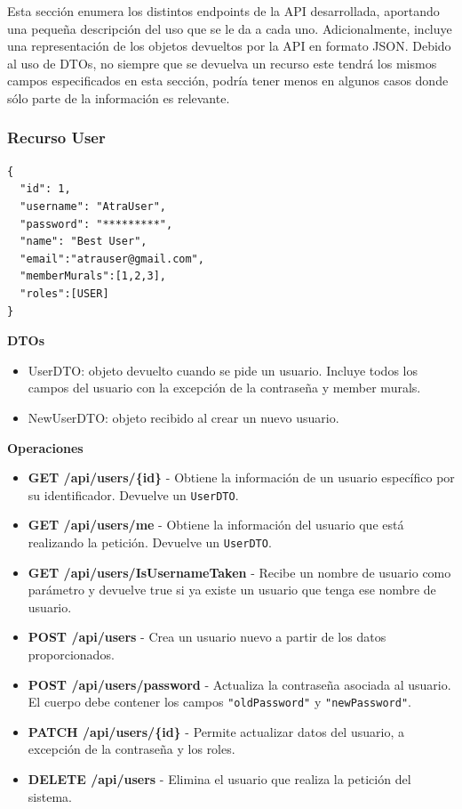 Esta sección enumera los distintos endpoints de la API desarrollada, aportando una pequeña descripción del uso que se le da a cada uno. Adicionalmente, incluye una representación de los objetos devueltos por la API en formato JSON. Debido al uso de DTOs, no siempre que se devuelva un recurso este tendrá los mismos campos especificados en esta sección, podría tener menos en algunos casos donde sólo parte de la información es relevante.
\subsubsection{Recurso User}
\begin{lstlisting}[basicstyle=\jsonbasicfont,frame=single,backgroundcolor=\color{white},rulecolor=\color{black},framerule=0.5pt,numbers=none]
{
  "id": 1,
  "username": "AtraUser",
  "password": "*********",
  "name": "Best User",
  "email":"atrauser@gmail.com",
  "memberMurals":[1,2,3],
  "roles":[USER]
}
\end{lstlisting}

\textbf{DTOs}
\begin{itemize}
    \item UserDTO: objeto devuelto cuando se pide un usuario. Incluye todos los campos del usuario con la excepción de la contraseña y member murals.
    \item NewUserDTO: objeto recibido al crear un nuevo usuario.
\end{itemize}

\textbf{Operaciones}
\begin{itemize}
    \item \textbf{GET /api/users/\{id\}} - Obtiene la información de un usuario específico por su identificador. Devuelve un \texttt{UserDTO}.
    \item \textbf{GET /api/users/me} - Obtiene la información del usuario que está realizando la petición.  Devuelve un \texttt{UserDTO}.
    \item \textbf{GET /api/users/IsUsernameTaken} - Recibe un nombre de usuario como parámetro y devuelve true si ya existe un usuario que tenga ese nombre de usuario.
    \item \textbf{POST /api/users} - Crea un usuario nuevo a partir de los datos proporcionados.
    \item \textbf{POST /api/users/password} - Actualiza la contraseña asociada al usuario. El cuerpo debe contener los campos \texttt{"oldPassword"} y \texttt{"newPassword"}.
    \item \textbf{PATCH /api/users/\{id\}} - Permite actualizar datos del usuario, a excepción de la contraseña y los roles.
    \item \textbf{DELETE /api/users} - Elimina el usuario que realiza la petición del sistema.
\end{itemize}

